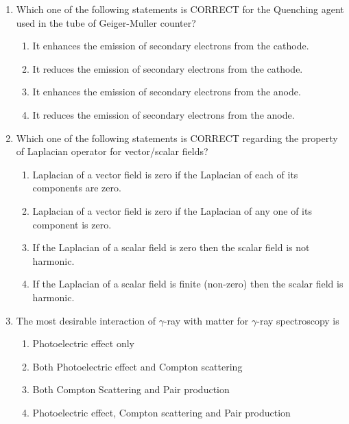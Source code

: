\documentclass[journal,12pt,onecolumn]{IEEEtran}
\theoremstyle{remark}
\begin{document}
\begin{enumerate}
    \item Which one of the following statements is CORRECT for the Quenching agent used in the tube of Geiger-Muller counter? \hfill{}
        \begin{enumerate}
                \item It enhances the emission of secondary electrons from the cathode.
                \item It reduces the emission of secondary electrons from the cathode.
                \item It enhances the emission of secondary electrons from the anode.
                \item It reduces the emission of secondary electrons from the anode.
        \end{enumerate}
    
    \item Which one of the following statements is CORRECT regarding the property of Laplacian operator for vector/scalar fields? \hfill{}
        \begin{enumerate}
            \item Laplacian of a vector field is zero if the Laplacian of each of its components are zero.
            \item Laplacian of a vector field is zero if the Laplacian of any one of its component is zero.
            \item If the Laplacian of a scalar field is zero then the scalar field is not harmonic.
            \item If the Laplacian of a scalar field is finite (non-zero) then the scalar field is harmonic.
        \end{enumerate}
    
    \item The most desirable interaction of $\gamma$-ray with matter for $\gamma$-ray spectroscopy is
    
    \hfill{}
        \begin{enumerate}
                \item Photoelectric effect only
                \item Both Photoelectric effect and Compton scattering
                \item Both Compton Scattering and Pair production
                \item Photoelectric effect, Compton scattering and Pair production
        \end{enumerate}
    

\end{enumerate}
\end{document}
